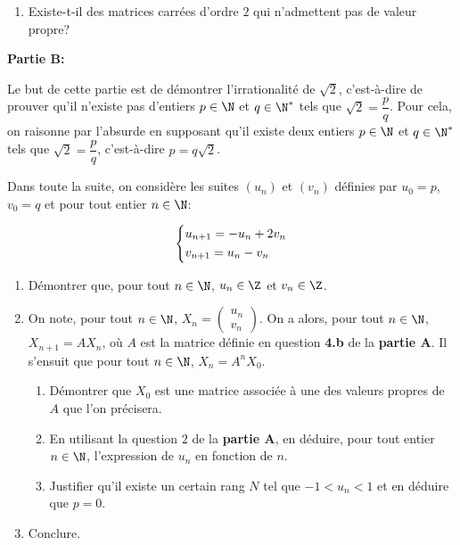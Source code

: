 \documentclass[a4paper]{article}
\begin{document}
\begin{exercice}{}{}
\begin{enumerate}
\begin{enumerate}
            \item Existe-t-il des matrices carrées d'ordre $2$ qui n'admettent pas de valeur propre?
        \end{enumerate}
    \end{enumerate}


    \textbf{Partie B:}

    Le but de cette partie est de démontrer l'irrationalité de $\sqrt{2}$, c'est-à-dire de prouver qu'il n'existe pas d'entiers $p\in\N$ et $q\in\N^*$ tels que $\sqrt{2}=\dfrac{p}{q}$. Pour cela, on raisonne par l'absurde en supposant 
    qu'il existe deux entiers $p\in\N$ et $q\in\N^*$ tels que $\sqrt{2}=\dfrac{p}{q}$, c'est-à-dire $p=q\sqrt{2}$.

    Dans toute la suite, on considère les suites $(u_n)$ et $(v_n)$ définies par $u_0=p$, $v_0=q$ et pour tout entier $n\in\N$:

    $$ \begin{dcases}
        u_{n+1}=-u_n+2v_n \\
        v_{n+1}=u_n-v_n
    \end{dcases}$$

    \begin{enumerate}
        \item Démontrer que, pour tout $n \in \N$, $u_n\in \Z$ et $v_n \in\Z$.
        \item On note, pour tout $n\in\N$, $X_n=\begin{pmatrix} u_n \\ v_n  \end{pmatrix}$. On a alors, pour tout $n\in \N$, $X_{n+1}=AX_n$, où $A$ est la matrice définie en question \textbf{4.b} de la \textbf{partie A}. Il s'ensuit que pour tout $n\in\N$, $X_n=A^nX_0$.
            \begin{enumerate}
                \item Démontrer que $X_0$ est une matrice associée à une des valeurs propres de $A$ que l'on précisera.
                \item En utilisant la question $2$ de la \textbf{partie A}, en déduire, pour tout entier $n\in\N$, l'expression de $u_n$ en fonction de $n$.
                \item Justifier qu'il existe un certain rang $N$ tel que $-1 < u_n < 1$ et en déduire que $p=0$.
            \end{enumerate}
            \item Conclure.
    \end{enumerate}
\end{exercice}
\end{document}
